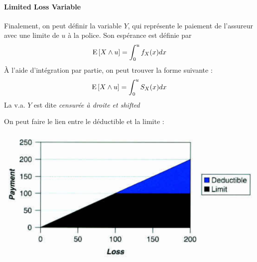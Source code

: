 \documentclass[12pt, french]{report}
\begin{document}
\paragraph{Limited Loss Variable} Finalement, on peut définir la variable $Y$, qui représente le paiement de l'assureur avec une limite de $u$ à la police. Son espérance est définie par
\begin{equation}
\mathrm{E} \left[ X \wedge u \right] = \int_{0}^{u} f_X(x) dx
\end{equation}
À l'aide d'intégration par partie, on peut trouver la forme suivante : 
\begin{align*}
\mathrm{E} \left[ X \wedge u \right] = \int_{0}^{u} S_X(x) dx
\end{align*}
La v.a. $Y$ est dite \textit{censurée à droite et shifted}

\begin{exemple}
On peut faire le lien entre le déductible et la limite : 
\begin{center}
\includegraphics[scale=0.45]{Figures/distinction_loss-deductible-limit}
\end{center}
\end{exemple}

\setcounter{section}{3}
%
%
%
\end{document}
